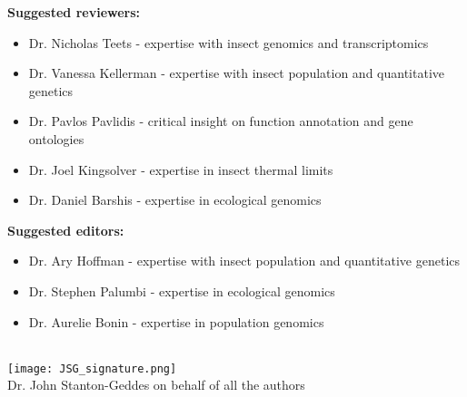 \documentclass[letterpaper]{article}
\begin{document}
\textbf{Suggested reviewers:}  

\begin{itemize}
  \item Dr. Nicholas Teets - expertise with insect genomics and transcriptomics
  \item Dr. Vanessa Kellerman - expertise with insect population and quantitative genetics
  \item Dr. Pavlos Pavlidis - critical insight on function annotation and gene ontologies
  \item Dr. Joel Kingsolver - expertise in insect thermal limits
  \item Dr. Daniel Barshis - expertise in ecological genomics
\end{itemize}

\textbf{Suggested editors:}  

\begin{itemize}
  \item Dr. Ary Hoffman - expertise with insect population and quantitative genetics
  \item Dr. Stephen Palumbi - expertise in ecological genomics
  \item Dr. Aurelie Bonin - expertise in population genomics
\end{itemize}


 \\
\texttt{[image: JSG\_signature.png]}  \\
Dr. John Stanton-Geddes on behalf of all the authors
\end{document}
